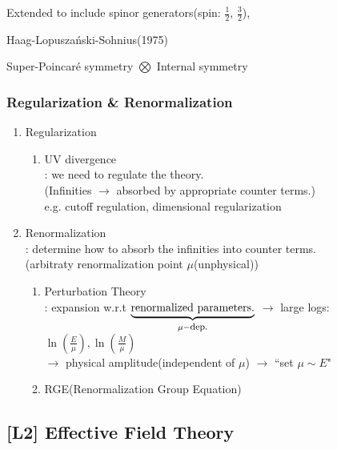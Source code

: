 \documentclass[11pt,letterpaper]{article}
\begin{document}
%
Extended to include spinor generators(spin: $\tfrac{1}{2}$, $\tfrac{3}{2}$),
%

\begin{note}
 Haag-Lopusza\'{n}ski-Sohnius(1975)
 { \normalfont
  \begin{center}
   Super-Poincar\'{e} symmetry $\bigotimes$ Internal symmetry
  \end{center}
 }
\end{note}

\VS

\subsubsection{Regularization \& Renormalization}
%
\begin{enumerate}
  \item Regularization
  \begin{enumerate}
    \item UV divergence \\
            : we need to regulate the theory. \\
         (Infinities $\rightarrow$ absorbed by appropriate counter terms.) \\
         e.g. cutoff regulation, dimensional regularization
  \end{enumerate}
  \item Renormalization \\
        : determine how to absorb the infinities into counter terms. \\
        (arbitraty renormalization point $\mu$(unphysical))
   \begin{enumerate}
     \item Perturbation Theory \\
            : expansion w.r.t $\underbrace{\mbox{renormalized parameters.}}_{\SM \mu - \mbox{dep.}}$
             $\rightarrow$ large logs: $\ln(\frac{E}{\mu}), \ln(\frac{M}{\mu})$ \\
             $\rightarrow$ physical amplitude(independent of $\mu$) $\rightarrow$ ``set $\mu \sim E$" \\
     \item RGE(Renormalization Group Equation) \\
   \end{enumerate}
\end{enumerate}

\newpage

\subsection{[L2] Effective Field Theory}
\end{document}
